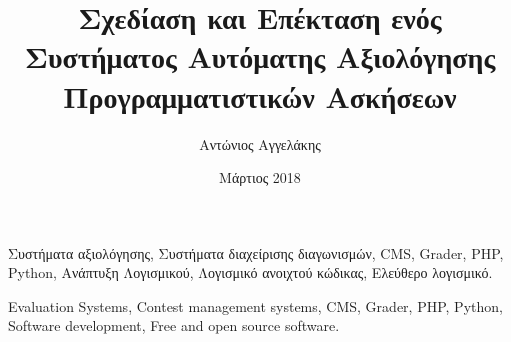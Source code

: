 \documentclass[diploma]{softlab-thesis}
\begin{document}

\frontmatter

\title{Σχεδίαση και Επέκταση ενός Συστήματος Αυτόματης Αξιολόγησης Προγραμματιστικών Ασκήσεων}
\author{Αντώνιος Αγγελάκης}
\date{Μάρτιος 2018}




\maketitle



\begin{abstractgr}%

\begin{keywordsgr}
Συστήματα αξιολόγησης, Συστήματα διαχείρισης διαγωνισμών, CMS, Grader, PHP,
Python, Ανάπτυξη Λογισμικού, Λογισμικό ανοιχτού κώδικας, Ελεύθερο λογισμικό.
\end{keywordsgr}
\end{abstractgr}



\begin{abstracten}%

\begin{keywordsen}
Evaluation Systems, Contest management systems, CMS, Grader, PHP, Python,
Software development, Free and open source software.
\end{keywordsen}
\end{abstracten}



\begin{acknowledgementsgr}
\end{acknowledgementsgr}



\tableofcontents
\listoftables
\listoffigures
\end{document}
